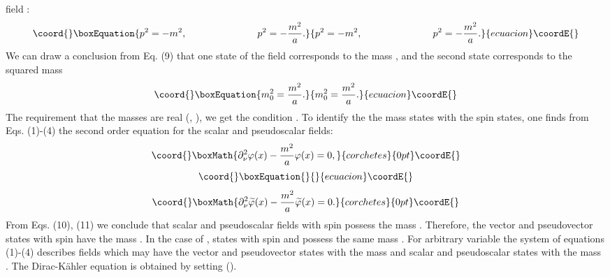 \documentclass[a4paper,12pt]{article}
\begin{document}
field \coordHE{}:
\begin{equation}\coord{}\boxEquation{
p^2=-m^2,\hspace{1.0in}p^2=-\frac{m^2}{a }. \label{9}
}{
p^2=-m^2,\hspace{1.0in}p^2=-\frac{m^2}{a }. }{ecuacion}\coordE{}\end{equation}
We can draw a conclusion from Eq. (9) that one state of the field
\coordHE{} corresponds to the mass \coordHE{}, and the second
state corresponds to the squared mass
\begin{equation}\coord{}\boxEquation{
m_0^2=\frac{m^2 }{a} . \label{10}
}{
m_0^2=\frac{m^2 }{a} . }{ecuacion}\coordE{}\end{equation}
The requirement that the masses are real (\coordHE{}, \coordHE{}), we
get the condition \coordHE{}. To identify the the mass states with the
spin states, one finds from Eqs. (1)-(4) the second order equation
for the scalar and pseudoscalar fields:
\[\coord{}\boxMath{
\partial _\nu ^2 \varphi (x)-\frac{m^2}{a}\varphi (x) =0 ,
}{corchetes}{0pt}\coordE{}\]
\vspace{-8mm}
\begin{equation}\coord{}\boxEquation{  \label{11}
}{  }{ecuacion}\coordE{}\end{equation}
\vspace{-8mm}
\[\coord{}\boxMath{
\partial _\nu ^2 \widetilde{\varphi}(x) -\frac{m^2}{a}\widetilde{\varphi} (x)=0.
}{corchetes}{0pt}\coordE{}\]
From Eqs. (10), (11) we conclude that scalar \coordHE{} and
pseudoscalar \coordHE{} fields with spin \coordHE{}
possess the mass \coordHE{}. Therefore, the vector and pseudovector
states with spin \coordHE{} have the mass \coordHE{}. In the case of \coordHE{},
states with spin \coordHE{} and \coordHE{} possess the same mass \coordHE{}. For
arbitrary variable \coordHE{} the system of equations (1)-(4) describes
fields which may have the vector and pseudovector states with the
mass \coordHE{} and scalar and pseudoscalar states with the mass \coordHE{}.
The Dirac-K\"ahler equation \cite{Kahler} is obtained by setting
\coordHE{} (\coordHE{}).
\end{document}
